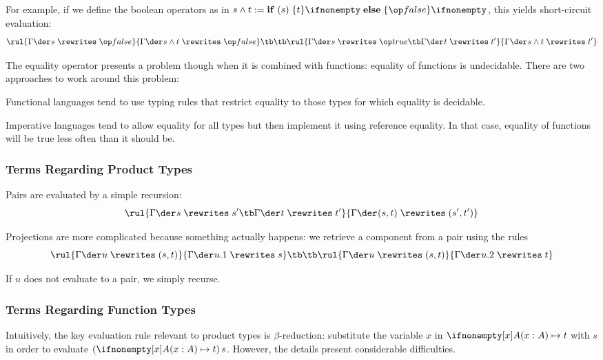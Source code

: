 For example, if we define the boolean operators as in $s\wedge t:=\aifelseI{s}{t}{\false}$, this yields short-circuit evaluation:
\[\rul{\evobj{}{\Gamma}{s}{\false}}
      {\evobj{}{\Gamma}{s\wedge t}{\false}}
\tb\tb
\rul{\evobj{}{\Gamma}{s}{\true} \tb\evobj{}{\Gamma}{t}{t'}}
      {\evobj{}{\Gamma}{s\wedge t}{t'}}
\]
\medskip

The equality operator presents a problem though when it is combined with functions: equality of functions is undecidable.
There are two approaches to work around this problem:
\begin{compactitem}
 \item Functional languages tend to use typing rules that restrict equality to those types for which equality is decidable.
 \item Imperative languages tend to allow equality for all types but then implement it using reference equality.
  In that case, equality of functions will be true less often than it should be.
\end{compactitem}



\subsubsection{Terms Regarding Product Types}

Pairs are evaluated by a simple recursion:
\[\rul{\evobj{}{\Gamma}{s}{s'} \tb \evobj{}{\Gamma}{t}{t'}}
      {\evobj{}{\Gamma}{(s,t)}{(s',t')}}
\]

Projections are more complicated because something actually happens: we retrieve a component from a pair using the rules
\[\rul{\evobj{}{\Gamma}{u}{(s,t)}}
      {\evobj{}{\Gamma}{u.1}{s}}
\tb\tb
\rul{\evobj{}{\Gamma}{u}{(s,t)}}
      {\evobj{}{\Gamma}{u.2}{t}}
\]

If $u$ does not evaluate to a pair, we simply recurse.

\subsubsection{Terms Regarding Function Types}

Intuitively, the key evaluation rule relevant to product types is $\beta$-reduction: substitute the variable $x$ in $\alam[A]{x}{t}$ with $s$ in order to evaluate $(\alam[A]{x}{t})\,s$.
However, the details  present considerable difficulties.


